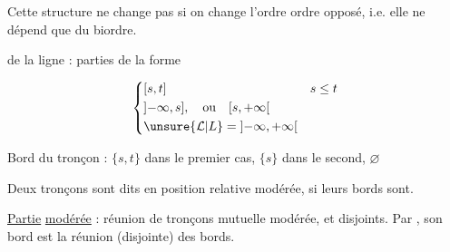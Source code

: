 
Cette structure ne change pas si
on change l'ordre  ordre opposé,
i.e. elle ne dépend que du
biordre.

 


 de la ligne : parties
de la forme

\[
\left\{\begin{aligned}
 &[s,t] &&s\leq t\\
 &\mathopen{]}-\infty,s],\quad\text{ou}\quad [s,+\infty\mathclose{[}\\
 &\unsure{\mathcal L|L}=\mathopen{]}-\infty,+\infty\mathclose{[}
\end{aligned}\right.
\]

Bord du tronçon : $\{s,t\}$ dans le
premier cas, $\{s\}$ dans le second, $\varnothing$ 

Deux tronçons sont dits en
position relative modérée, si leurs
bords \unsure{:|}  sont.

\uline{Partie} \uline{modérée} :
réunion  de tronçons  mutuelle
modérée, et disjoints.  Par
, son bord est la réunion
(disjointe) des bords.

